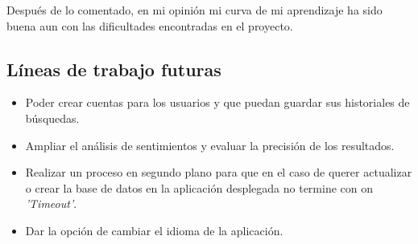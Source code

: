 Después de lo comentado, en mi opinión mi curva de mi aprendizaje ha sido buena aun con las dificultades encontradas en el proyecto.

\subsection{Líneas de trabajo futuras}
\begin{itemize}
    \item Poder crear cuentas para los usuarios y que puedan guardar sus historiales de búsquedas.
    \item Ampliar el análisis de sentimientos y evaluar la precisión de los resultados.
    \item Realizar un proceso en segundo plano para que en el caso de querer actualizar o crear la base de datos en la aplicación desplegada no termine con on \textit{'Timeout'}.
    \item Dar la opción de cambiar el idioma de la aplicación.
\end{itemize}

 
